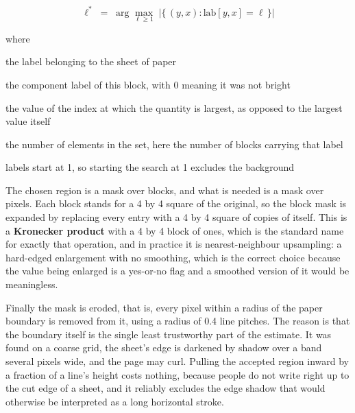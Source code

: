 \begin{equation}
\ell^{*} \;=\; \arg\max_{\ell \ge 1} \;\big|\{\,(y,x) : \mathrm{lab}[y,x] = \ell \,\}\big|
\end{equation}

\noindent where
\begin{description}[leftmargin=2.4em,style=nextline,font=\normalfont\ttfamily]\setlength\itemsep{1pt}
  \item[{$\ell^{*}$}] \normalfont the label belonging to the sheet of paper
  \item[{$\mathrm{lab}[y,x]$}] \normalfont the component label of this block, with 0 meaning it was not bright
  \item[{$\arg\max$}] \normalfont the value of the index at which the quantity is largest, as opposed to the largest value itself
  \item[{$|\{\cdot\}|$}] \normalfont the number of elements in the set, here the number of blocks carrying that label
  \item[{$\ell \ge 1$}] \normalfont labels start at 1, so starting the search at 1 excludes the background
\end{description}

The chosen region is a mask over blocks, and what is needed is a mask over pixels. Each block stands for a 4 by 4 square of the original, so the block mask is expanded by replacing every entry with a 4 by 4 square of copies of itself. This is a \textbf{Kronecker product} with a 4 by 4 block of ones, which is the standard name for exactly that operation, and in practice it is nearest-neighbour upsampling: a hard-edged enlargement with no smoothing, which is the correct choice because the value being enlarged is a yes-or-no flag and a smoothed version of it would be meaningless.


Finally the mask is eroded, that is, every pixel within a radius of the paper boundary is removed from it, using a radius of 0.4 line pitches. The reason is that the boundary itself is the single least trustworthy part of the estimate. It was found on a coarse grid, the sheet's edge is darkened by shadow over a band several pixels wide, and the page may curl. Pulling the accepted region inward by a fraction of a line's height costs nothing, because people do not write right up to the cut edge of a sheet, and it reliably excludes the edge shadow that would otherwise be interpreted as a long horizontal stroke.


